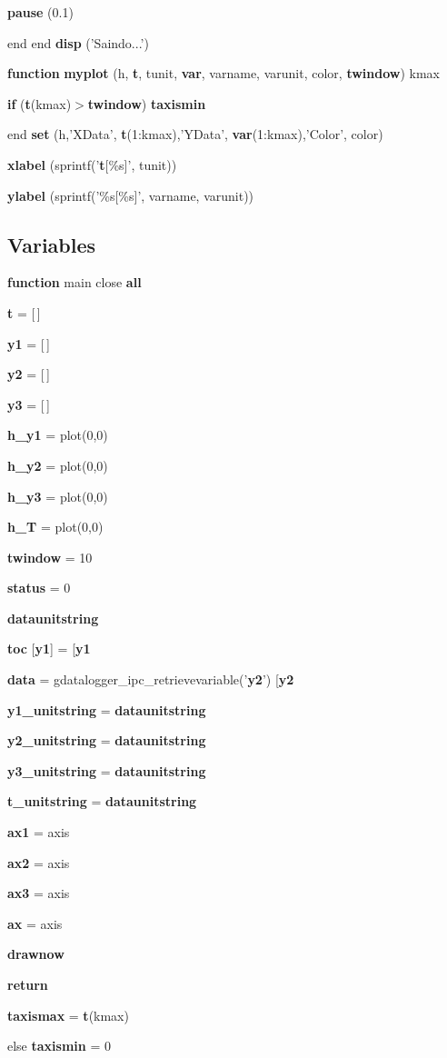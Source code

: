 \begin{DoxyCompactItemize}
\item 
{\bf pause} (0.1)
\item 
end end {\bf disp} ('Saindo...')
\item 
{\bf function} {\bf myplot} (h, {\bf t}, tunit, {\bf var}, varname, varunit, color, {\bf twindow}) kmax
\item 
{\bf if} ({\bf t}(kmax)$>${\bf twindow}) {\bf taxismin}
\item 
end {\bf set} (h,'XData', {\bf t}(1:kmax),'YData', {\bf var}(1:kmax),'Color', color)
\item 
{\bf xlabel} (sprintf('{\bf t}[\%s]', tunit))
\item 
{\bf ylabel} (sprintf('\%s[\%s]', varname, varunit))
\end{DoxyCompactItemize}
\subsection*{Variables}
\begin{DoxyCompactItemize}
\item 
{\bf function} main close {\bf all}
\item 
{\bf t} = [$\,$]
\item 
{\bf y1} = [$\,$]
\item 
{\bf y2} = [$\,$]
\item 
{\bf y3} = [$\,$]
\item 
{\bf h\_\-y1} = plot(0,0)
\item 
{\bf h\_\-y2} = plot(0,0)
\item 
{\bf h\_\-y3} = plot(0,0)
\item 
{\bf h\_\-T} = plot(0,0)
\item 
{\bf twindow} = 10
\item 
{\bf status} = 0
\item 
{\bf dataunitstring}
\item 
{\bf toc} [{\bf y1}] = [{\bf y1}
\item 
{\bf data} = gdatalogger\_\-ipc\_\-retrievevariable('{\bf y2}') [{\bf y2}
\item 
{\bf y1\_\-unitstring} = {\bf dataunitstring}
\item 
{\bf y2\_\-unitstring} = {\bf dataunitstring}
\item 
{\bf y3\_\-unitstring} = {\bf dataunitstring}
\item 
{\bf t\_\-unitstring} = {\bf dataunitstring}
\item 
{\bf ax1} = axis
\item 
{\bf ax2} = axis
\item 
{\bf ax3} = axis
\item 
{\bf ax} = axis
\item 
{\bf drawnow}
\item 
{\bf return}
\item 
{\bf taxismax} = {\bf t}(kmax)
\item 
else {\bf taxismin} = 0
\end{DoxyCompactItemize}



